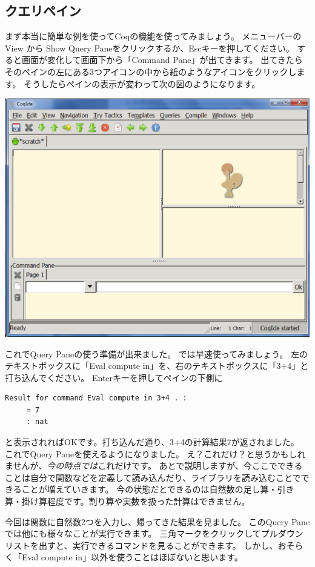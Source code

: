 \documentclass{jsbook}
\begin{document}
\subsection*{クエリペイン}
まず本当に簡単な例を使ってCoqの機能を使ってみましょう。
メニューバーのView から Show Query Paneをクリックするか、Escキーを押してください。
すると画面が変化して画面下から「Command Pane」が出てきます。
出てきたらそのペインの左にある3つアイコンの中から紙のようなアイコンをクリックします。
そうしたらペインの表示が変わって次の図のようになります。
\begin{center}
	\includegraphics[width=38zw]{image/queryPane.eps}\\
	\label{querypane}
\end{center}

これでQuery Paneの使う準備が出来ました。
では早速使ってみましょう。
左のテキストボックスに「Eval compute in」を、右のテキストボックスに「3+4」と打ち込んでください。
Enterキーを押してペインの下側に
\begin{verbatim}
Result for command Eval compute in 3+4 . :
     = 7
     : nat
\end{verbatim}
と表示されればOKです。打ち込んだ通り、3+4の計算結果7が返されました。
これでQuery Paneを使えるようになりました。
え？これだけ？と思うかもしれませんが、\emph{今の時点では}これだけです。
あとで説明しますが、今ここでできることは自分で関数などを定義して読み込んだり、ライブラリを読み込むことでできることが増えていきます。
今の状態だとできるのは自然数の足し算・引き算・掛け算程度です。割り算や実数を扱った計算はできません。

今回は関数に自然数2つを入力し、帰ってきた結果を見ました。
このQuery Paneでは他にも様々なことが実行できます。
三角マークをクリックしてプルダウンリストを出すと、実行できるコマンドを見ることができます。
しかし、おそらく「Eval compute in」以外を使うことはほぼないと思います。
\end{document}
